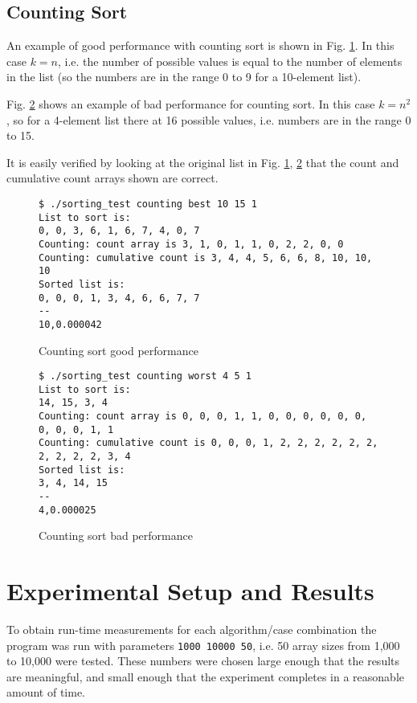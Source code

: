 \documentclass{article}
\begin{document}
\subsection{Counting Sort}

An example of good performance with counting sort is shown in Fig. \ref{counting-good-test}. In this case $k=n$, i.e. the number of possible values is equal to the number of elements in the list (so the numbers are in the range 0 to 9 for a 10-element list).

Fig. \ref{counting-bad-test} shows an example of bad performance for counting sort. In this case $k=n^2$, so for a 4-element list there at 16 possible values, i.e. numbers are in the range 0 to 15.

It is easily verified by looking at the original list in Fig. \ref{counting-good-test}, \ref{counting-bad-test} that the count and cumulative count arrays shown are correct.

\begin{figure}[H]
	\centering
	\begin{BVerbatim}
$ ./sorting_test counting best 10 15 1
List to sort is:
0, 0, 3, 6, 1, 6, 7, 4, 0, 7
Counting: count array is 3, 1, 0, 1, 1, 0, 2, 2, 0, 0
Counting: cumulative count is 3, 4, 4, 5, 6, 6, 8, 10, 10, 10
Sorted list is:
0, 0, 0, 1, 3, 4, 6, 6, 7, 7
--
10,0.000042
	\end{BVerbatim}
	\caption{Counting sort good performance}
	\label{counting-good-test}
\end{figure}

\begin{figure}[H]
	\centering
	\begin{BVerbatim}
$ ./sorting_test counting worst 4 5 1
List to sort is:
14, 15, 3, 4
Counting: count array is 0, 0, 0, 1, 1, 0, 0, 0, 0, 0, 0, 0, 0, 0, 1, 1
Counting: cumulative count is 0, 0, 0, 1, 2, 2, 2, 2, 2, 2, 2, 2, 2, 2, 3, 4
Sorted list is:
3, 4, 14, 15
--
4,0.000025
	\end{BVerbatim}
	\caption{Counting sort bad performance}
	\label{counting-bad-test}
\end{figure}

\section{Experimental Setup and Results}

To obtain run-time measurements for each algorithm/case combination the program was run{\footnotemark} with parameters \texttt{1000 10000 50}, i.e. 50 array sizes from 1,000 to 10,000 were tested. These numbers were chosen large enough that the results are meaningful, and small enough that the experiment completes in a reasonable amount of time.
\end{document}
